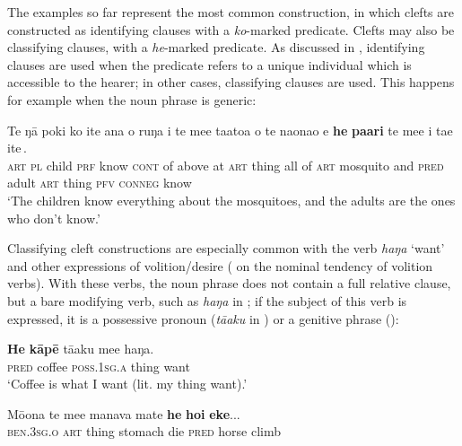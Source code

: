 The examples so far represent the most common construction, in which clefts are constructed as identifying clauses with a \textit{ko}{}-marked predicate. Clefts may also be classifying clauses, with a \textit{he}{}-marked predicate. As discussed in , identifying clauses are used when the predicate refers to a unique individual which is accessible to the hearer; in other cases, classifying clauses are used. This happens for example when the noun phrase is generic:

\ea\label{ex:9.44}
\gll Te ŋā poki ko {\ꞌ}ite {\ꞌ}ana o ruŋa i te me{\ꞌ}e ta{\ꞌ}ato{\ꞌ}a o te naonao {\ꞌ}e \textbf{he} \textbf{pa{\ꞌ}ari} {\ob}te me{\ꞌ}e i ta{\ꞌ}e {\ꞌ}ite\,{\cb}. \\
\textsc{art} \textsc{pl} child \textsc{prf} know \textsc{cont} of above at \textsc{art} thing all of \textsc{art} mosquito and \textsc{pred} adult {\db}\textsc{art} thing \textsc{pfv} \textsc{conneg} know \\

\glt 
‘The children know everything about the mosquitoes, and the adults are the ones who don’t know.’ \textstyleExampleref{[R535.159]} 
\z

Classifying cleft constructions are especially common with the verb \textit{haŋa} ‘want’ and other expressions of volition/desire ( on the nominal tendency of volition verbs). With these verbs, the noun phrase does not contain a full relative clause, but a bare modifying verb, such as \textit{haŋa} in ; if the subject of this verb is expressed, it is a possessive pronoun (\textit{tā{\ꞌ}aku} in ) or a genitive phrase ():

\ea\label{ex:9.45}
\gll \textbf{He} \textbf{kāpē} tā{\ꞌ}aku me{\ꞌ}e haŋa. \\
\textsc{pred} coffee \textsc{poss.1sg.a} thing want \\

\glt 
‘Coffee is what I want (lit. my thing want).’ \textstyleExampleref{[R221.024]} 
\z

\ea\label{ex:9.46}
\gll Mō{\ꞌ}ona te me{\ꞌ}e manava mate \textbf{he} \textbf{hoi} \textbf{eke}... \\
\textsc{ben.3sg.o} \textsc{art} thing stomach die{\rmfnm} \textsc{pred} horse climb \\


